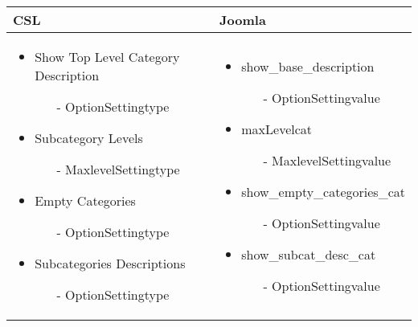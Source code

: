 \begin{minipage}{0.7\textwidth}
\begin{tabular}{| p{}|p{}|}
\hline
\textbf{CSL} & \textbf{Joomla} \\ 
\hline
\begin{itemize}
	\item Show Top Level Category Description
	\begin{enumerate}
			 \item[-] OptionSettingtype
	\end{enumerate} 
	\item Subcategory Levels 
		\begin{enumerate}
				 \item[-] MaxlevelSettingtype
		\end{enumerate}
	\item Empty Categories 
		\begin{enumerate}
			 \item[-] OptionSettingtype
		\end{enumerate}
	\item Subcategories Descriptions
	 \begin{enumerate}
	 		 \item[-] OptionSettingtype
	 \end{enumerate}
\end{itemize}
 & 
\begin{itemize}
	\item show\_base\_description
	\begin{enumerate}
			 \item[-] OptionSettingvalue
	\end{enumerate} 
	\item maxLevelcat 
		\begin{enumerate}
				 \item[-] MaxlevelSettingvalue
		\end{enumerate}
	\item show\_empty\_categories\_cat 
		\begin{enumerate}
			 \item[-] OptionSettingvalue
		\end{enumerate}
	\item show\_subcat\_desc\_cat
	 \begin{enumerate}
	 		 \item[-] OptionSettingvalue
	 \end{enumerate}
\end{itemize}
\\
\hline
\end{tabular}
\end{minipage}


